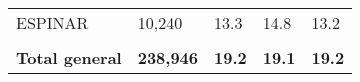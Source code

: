 \begin{tabular}{lllll}
	\cellcolor[HTML]{FF5050}ESPINAR                                & 10,240                                                                & 13.3                                                                             & 14.8                                                                        & 13.2                                                                                \\
	&                                                                       &                                                                                  &                                                                             &                                                                                     \\
	\rowcolor[HTML]{DDEBF7} 
	\textbf{Total   general}                                       & \textbf{238,946}                                                      & \textbf{19.2}                                                                    & \textbf{19.1}                                                               & \textbf{19.2}                                                                      
\end{tabular}